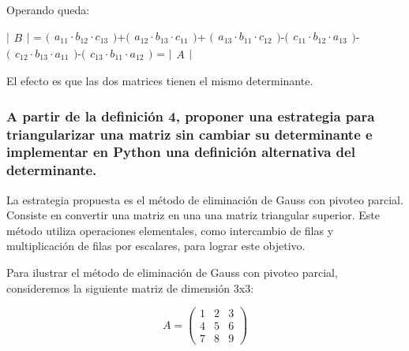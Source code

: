 \documentclass[11pt]{article}
\begin{document}
    Operando queda:

    \(\bigl|\begin{matrix}B\end{matrix}\bigr|\) =
\(\bigl(\begin{matrix}a_{11} \cdot b_{12} \cdot c_{13}\end{matrix}\bigr)\)+\(\bigl(\begin{matrix}a_{12} \cdot b_{13} \cdot c_{11}\end{matrix}\bigr)\)+
\(\bigl(\begin{matrix}a_{13} \cdot b_{11} \cdot c_{12}\end{matrix}\bigr)\)-\(\bigl(\begin{matrix}c_{11} \cdot b_{12} \cdot a_{13}\end{matrix}\bigr)\)-
\(\bigl(\begin{matrix}c_{12} \cdot b_{13} \cdot a_{11}\end{matrix}\bigr)\)-\(\bigl(\begin{matrix}c_{13} \cdot b_{11} \cdot a_{12}\end{matrix}\bigr)\)
= \(\bigl|\begin{matrix}A\end{matrix}\bigr|\)

El efecto es que las dos matrices tienen el mismo determinante.

    \subsubsection{A partir de la definición 4, proponer una estrategia para
triangularizar una matriz sin cambiar su determinante e implementar en
Python una definición alternativa del
determinante.}\label{a-partir-de-la-definiciuxf3n-4-proponer-una-estrategia-para-triangularizar-una-matriz-sin-cambiar-su-determinante-e-implementar-en-python-una-definiciuxf3n-alternativa-del-determinante.}

    La estrategia propuesta es el método de eliminación de Gauss con pivoteo
parcial. Consiste en convertir una matriz en una una matriz triangular
superior. Este método utiliza operaciones elementales, como intercambio
de filas y multiplicación de filas por escalares, para lograr este
objetivo.

    Para ilustrar el método de eliminación de Gauss con pivoteo parcial,
consideremos la siguiente matriz de dimensión 3x3:

    \begin{equation}
A =
    \begin{pmatrix}
        1 & 2 & 3\\
        4 & 5 & 6\\
        7 & 8 & 9
    \end{pmatrix}
\end{equation}
\end{document}
